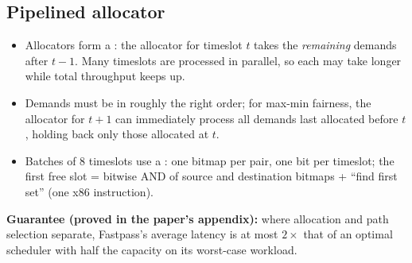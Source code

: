 \subsection{Pipelined allocator}
\begin{itemize}
\item Allocators form a : the allocator for timeslot $t$ takes the \emph{remaining} demands after $t-1$. Many timeslots are processed in parallel, so each may take longer while total throughput keeps up.
\item Demands must be in roughly the right order; for max-min fairness, the allocator for $t+1$ can immediately process all demands last allocated before $t$, holding back only those allocated at $t$.
\item Batches of 8 timeslots use a : one bitmap per pair, one bit per timeslot; the first free slot = bitwise AND of source and destination bitmaps + ``find first set'' (one x86 instruction).
\end{itemize}
\textbf{Guarantee (proved in the paper's appendix):} where allocation and path selection separate, Fastpass's average latency is at most $2\times$ that of an optimal scheduler with half the capacity on its worst-case workload.

